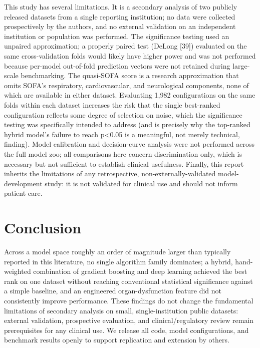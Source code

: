\documentclass[twoside,11pt]{article}
\begin{document}
This study has several limitations. It is a secondary analysis of two publicly released datasets from a single reporting institution; no data were collected prospectively by the authors, and no external validation on an independent institution or population was performed. The significance testing used an unpaired approximation; a properly paired test (DeLong [39]) evaluated on the same cross-validation folds would likely have higher power and was not performed because per-model out-of-fold prediction vectors were not retained during large-scale benchmarking. The quasi-SOFA score is a research approximation that omits SOFA's respiratory, cardiovascular, and neurological components, none of which are available in either dataset. Evaluating 1,982 configurations on the same folds within each dataset increases the risk that the single best-ranked configuration reflects some degree of selection on noise, which the significance testing was specifically intended to address (and is precisely why the top-ranked hybrid model's failure to reach p<0.05 is a meaningful, not merely technical, finding). Model calibration and decision-curve analysis were not performed across the full model zoo; all comparisons here concern discrimination only, which is necessary but not sufficient to establish clinical usefulness. Finally, this report inherits the limitations of any retrospective, non-externally-validated model-development study: it is not validated for clinical use and should not inform patient care.

\section{Conclusion}

Across a model space roughly an order of magnitude larger than typically reported in this literature, no single algorithm family dominates; a hybrid, hand-weighted combination of gradient boosting and deep learning achieved the best rank on one dataset without reaching conventional statistical significance against a simple baseline, and an engineered organ-dysfunction feature did not consistently improve performance. These findings do not change the fundamental limitations of secondary analysis on small, single-institution public datasets: external validation, prospective evaluation, and clinical/regulatory review remain prerequisites for any clinical use. We release all code, model configurations, and benchmark results openly to support replication and extension by others.

\end{document}
